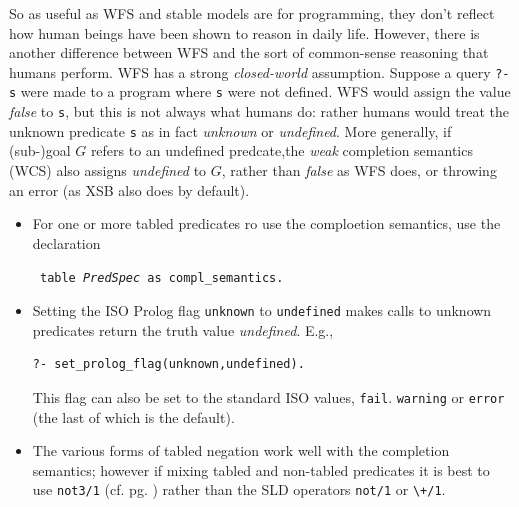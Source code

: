 So as useful as WFS and stable models are for programming, they don't
reflect how human beings have been shown to reason in daily life.
However, there is another difference between WFS and the sort of
common-sense reasoning that humans perform.  WFS has a strong {\em
  closed-world} assumption.  Suppose a query {\tt ?- s} were made to a
program where {\tt s} were not defined.  WFS would assign the value
{\em false} to {\tt s}, but this is not always what humans do: rather
humans would treat the unknown predicate {\tt s} as in fact {\em
  unknown} or {\em undefined}.  More generally, if (sub-)goal $G$
refers to an undefined predcate,the {\em weak} completion semantics
(WCS) also assigns {\em undefined} to $G$, rather than {\em false} as
WFS does, or throwing an error (as XSB also does by default).

\begin{itemize}
\item For one or more tabled predicates ro use the comploetion semantics,
use the declaration

\noindent
{\tt \mif{} table {\em PredSpec} as compl\_semantics.}

\item Setting the ISO Prolog flag {\tt unknown} to {\tt undefined}
  makes calls to unknown predicates return the truth value {\em
    undefined}.  E.g., 
\begin{verbatim}
?- set_prolog_flag(unknown,undefined).
\end{verbatim}
This flag can also be set to the standard ISO values,
  {\tt fail}. {\tt warning} or {\tt error} (the last of which is the
    default).

\item The various forms of tabled negation work well with the
  completion semantics; however if mixing tabled and non-tabled
  predicates it is best to use {\tt not3/1} (cf. pg. \pageref{not3})
  rather than the SLD operators {\tt not/1} or \verb|\+/1|.
\end{itemize}



